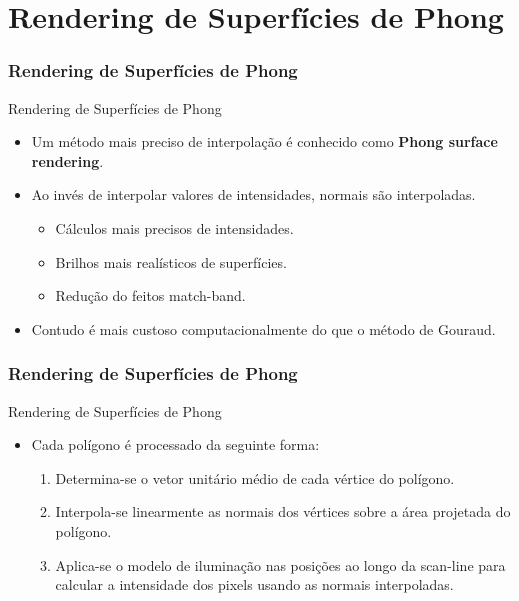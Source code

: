 \documentclass{beamer}
\begin{document}
\section{Rendering de Superfícies de Phong}
\begin{frame}
\frametitle{Rendering de Superfícies de Phong}

		\begin{block}{Rendering de Superfícies de Phong}
		\begin{itemize}
			\item Um método mais preciso de interpolação é conhecido como \textbf{Phong surface rendering}.
			\item Ao invés de interpolar valores de intensidades, normais são interpoladas.
			\begin{itemize}
				\item Cálculos mais precisos de intensidades.
				\item Brilhos mais realísticos de superfícies.
				\item Redução do feitos match-band.
			\end{itemize}
			\item Contudo é mais custoso computacionalmente do que o método de Gouraud.
		\end{itemize}
	\end{block}
\end{frame}

\begin{frame}
\frametitle{Rendering de Superfícies de Phong}

		\begin{block}{Rendering de Superfícies de Phong}
		\begin{itemize}
			\item Cada polígono é processado da seguinte forma:
			\begin{enumerate}
				\item Determina-se o vetor unitário médio de cada vértice do polígono.
				\item Interpola-se linearmente as normais dos vértices sobre a área projetada do polígono.
				\item Aplica-se o modelo de iluminação nas posições ao longo da scan-line para calcular a intensidade dos pixels usando as normais interpoladas.
			\end{enumerate}
		\end{itemize}
	\end{block}
\end{frame}
\end{document}
